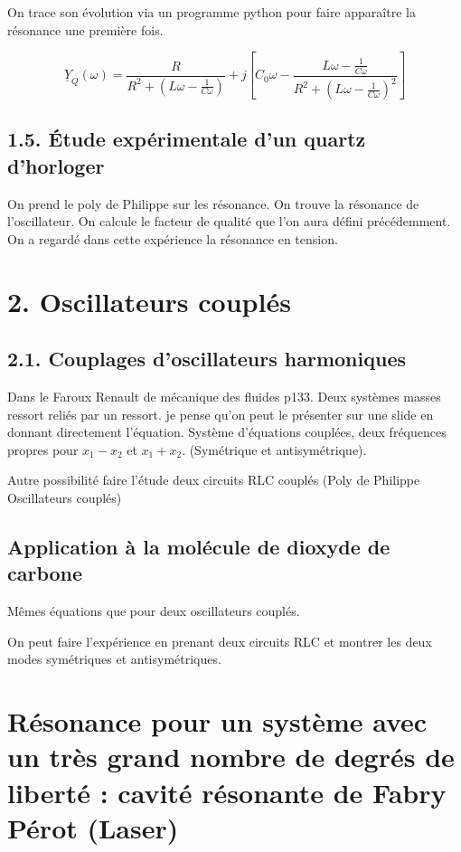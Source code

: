 \documentclass[french, a4paper, 10pt, twocolumn, landscape]{article}
\begin{document}
On trace son évolution via un programme python pour faire apparaître la résonance une première fois.

\begin{equation}
    \underline{Y}_Q(\omega) = \dfrac{R}{R^2+\left(L\omega-\frac{1}{C\omega}\right)}+j\left[C_0\omega-\dfrac{L\omega-\frac{1}{C\omega}}{R^2+\left(L\omega-\frac{1}{C\omega}\right)^2}\right]
\end{equation}

\subsection*{1.5. Étude expérimentale d'un quartz d'horloger}

On prend le poly de Philippe sur les résonance.  On trouve la résonance de l'oscillateur. On calcule le facteur de qualité que l'on aura défini précédemment. On a regardé dans cette expérience la résonance en tension.

\section*{2. Oscillateurs couplés}
\subsection*{2.1. Couplages d'oscillateurs harmoniques}

Dans le Faroux Renault de mécanique des fluides p133. Deux systèmes masses ressort reliés par un ressort. je pense qu'on peut le présenter sur une slide en donnant directement l'équation. Système d'équations couplées, deux fréquences propres pour $x_1-x_2$ et $x_1+x_2$. (Symétrique et antisymétrique).\medskip

Autre possibilité faire l'étude deux circuits RLC couplés (Poly de Philippe Oscillateurs couplés)

\subsection*{Application à la molécule de dioxyde de carbone}
Mêmes équations que pour deux oscillateurs couplés.\medskip

On peut faire l'expérience en prenant deux circuits RLC et montrer les deux modes symétriques et antisymétriques.

\section*{Résonance pour un système avec un très grand nombre de degrés de liberté : cavité résonante de Fabry Pérot (Laser)}
\end{document}
